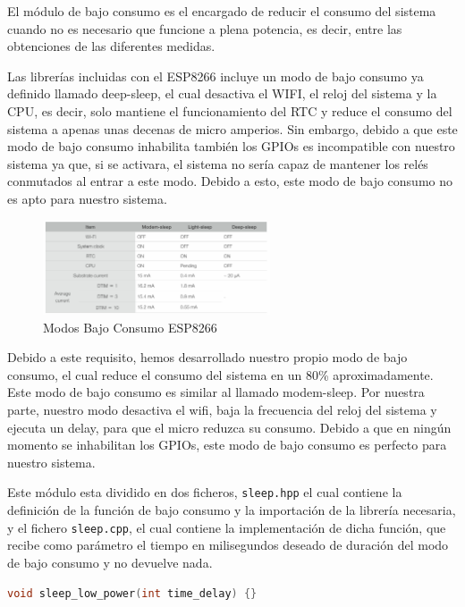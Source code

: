 El módulo de bajo consumo es el encargado de reducir el consumo del sistema cuando no es necesario que funcione a plena potencia, es decir, entre las obtenciones de las diferentes medidas.


Las librerías incluidas con el ESP8266 incluye un modo de bajo consumo ya definido llamado deep-sleep, el cual desactiva el WIFI, el reloj del sistema y la CPU, es decir, solo mantiene el funcionamiento del RTC y reduce el consumo del sistema a apenas unas decenas de micro amperios. Sin embargo, debido a que este modo de bajo consumo inhabilita también los GPIOs es incompatible con nuestro sistema ya que, si se activara, el sistema no sería capaz de mantener los relés conmutados al entrar a este modo. Debido a esto, este modo de bajo consumo no es apto para nuestro sistema. \cite{esp8266ESP8266LowPower}

\begin{figure}[H]
    \centering
    \includegraphics[width=0.6\textwidth]{images/3-software/3-2-5-lowpower/Modos Bajo Consumo.png}
    \caption{Modos Bajo Consumo ESP8266}
    \label{fig:3-2-5-1-ModosBajoConsumo}
\end{figure}

Debido a este requisito, hemos desarrollado nuestro propio modo de bajo consumo, el cual reduce el consumo del sistema en un 80\% aproximadamente. Este modo de bajo consumo es similar al llamado modem-sleep. Por nuestra parte, nuestro modo desactiva el wifi, baja la frecuencia del reloj del sistema y ejecuta un delay, para que el micro reduzca su consumo. Debido a que en ningún momento se inhabilitan los GPIOs, este modo de bajo consumo es perfecto para nuestro sistema.


Este módulo esta dividido en dos ficheros, \texttt{sleep.hpp} el cual contiene la definición de la función de bajo consumo y la importación de la librería necesaria, y el fichero \texttt{sleep.cpp}, el cual contiene la implementación de dicha función, que recibe como parámetro el tiempo en milisegundos deseado de duración del modo de bajo consumo y no devuelve nada.

\begin{lstlisting}[captionpos=b, caption={Función bajo consumo}, language=c++]
    void sleep_low_power(int time_delay) {}
\end{lstlisting}

